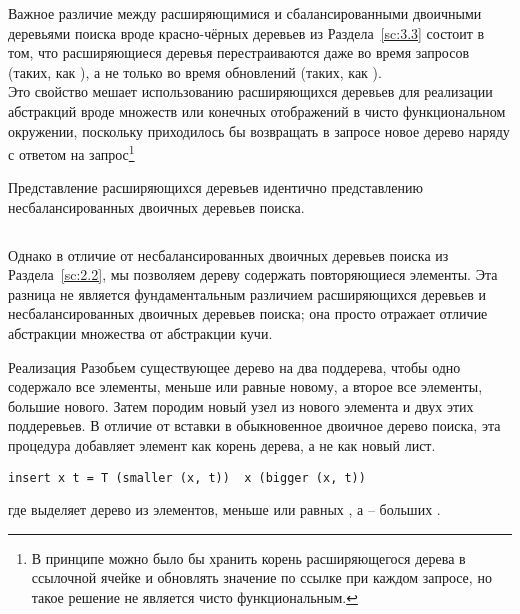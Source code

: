 \documentclass[aspectratio=169
  , xcolor={svgnames}
  , hyperref={ colorlinks,citecolor=DeepPink4
             , linkcolor=DarkRed,urlcolor=DarkBlue}
  , russian
  ]{beamer}
\theoremstyle{exerciseStyle1}
\begin{document}
\begin{frame}[fragile]{}
Важное различие между расширяющимися и сбалансированными
двоичными деревьями поиска вроде красно-чёрных деревьев из
Раздела~\ref{sc:3.3} состоит в том, что расширяющиеся деревья
перестраиваются даже во время запросов (таких, как ),
а не только во время обновлений (таких, как ). \\

Это
свойство мешает использованию расширяющихся деревьев для реализации
абстракций вроде множеств или конечных отображений в чисто
функциональном окружении, поскольку приходилось бы возвращать в
запросе новое дерево наряду с ответом на запрос\footnote{%
  В принципе можно было бы хранить корень расширяющегося дерева в
  ссылочной ячейке и обновлять значение по ссылке при каждом запросе, но
  такое решение не является чисто функциональным.
}
\end{frame}


\begin{frame}[fragile]{}
Представление расширяющихся деревьев идентично представлению
несбалансированных двоичных деревьев поиска.
\inputminted[firstline=5,lastline=5] {haskell}{code/SplayHeap.lhs}


Однако в отличие от несбалансированных двоичных деревьев поиска из
Раздела~\ref{sc:2.2}, мы позволяем дереву содержать повторяющиеся
элементы. Эта разница не является фундаментальным различием расширяющихся
деревьев и несбалансированных двоичных деревьев поиска; она просто
отражает отличие абстракции множества от абстракции кучи.

\end{frame}


\begin{frame}[fragile]{Реализация  }
Разобьем существующее дерево на два поддерева, чтобы одно содержало все
элементы, меньше или равные новому, а второе все элементы, большие
нового. Затем породим новый узел из нового элемента и двух этих
поддеревьев. В отличие от вставки в обыкновенное двоичное дерево
поиска, эта процедура добавляет элемент как корень дерева, а не как
новый лист.

\begin{verbatim}
insert x t = T (smaller (x, t))  x (bigger (x, t))
\end{verbatim}


где  выделяет дерево из элементов, меньше или равных
, а  -- больших
. 

\end{frame}
\end{document}
